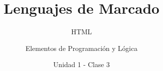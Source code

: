 \documentclass[usenames,dvipsnames]{../../common/beamerUNQaccessible}
\title{Lenguajes de Marcado}
\subtitle{HTML}
\author{Elementos de Programación y Lógica}
\date{Unidad 1 - Clase 3}
\begin{document}
  \titleframe
  \toc
  
  \finaltitleframe
\end{document}
